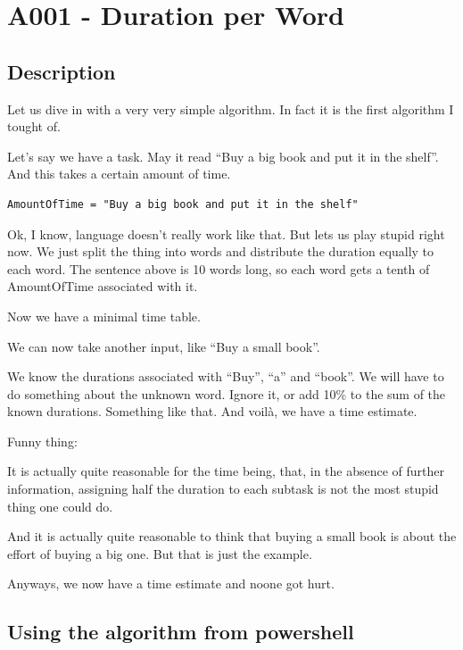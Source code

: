 \newpage{}

\hypertarget{a001---duration-per-word}{%
\section{A001 - Duration per Word}\label{a001---duration-per-word}}

\hypertarget{description}{%
\subsection{Description}\label{description}}

Let us dive in with a very very simple algorithm. In fact it is the
first algorithm I tought of.

Let's say we have a task. May it read ``Buy a big book and put it in the
shelf''. And this takes a certain amount of time.

\begin{verbatim}
AmountOfTime = "Buy a big book and put it in the shelf"
\end{verbatim}

Ok, I know, language doesn't really work like that. But lets us play
stupid right now. We just split the thing into words and distribute the
duration equally to each word. The sentence above is 10 words long, so
each word gets a tenth of AmountOfTime associated with it.

Now we have a minimal time table.

We can now take another input, like ``Buy a small book''.

We know the durations associated with ``Buy'', ``a'' and ``book''. We
will have to do something about the unknown word. Ignore it, or add 10\%
to the sum of the known durations. Something like that. And voilà, we
have a time estimate.

Funny thing:

It is actually quite reasonable for the time being, that, in the absence
of further information, assigning half the duration to each subtask is
not the most stupid thing one could do.

And it is actually quite reasonable to think that buying a small book is
about the effort of buying a big one. But that is just the example.

Anyways, we now have a time estimate and noone got hurt.

\hypertarget{using-the-algorithm-from-powershell}{%
\subsection{Using the algorithm from
powershell}\label{using-the-algorithm-from-powershell}}

